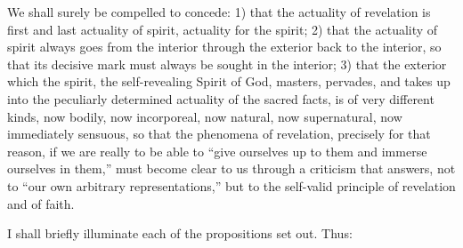 \documentclass[12pt]{book}
\newcommand{\opage}[1]{\marginnote{\footnotesize\textit{[#1]}}}
\begin{document}
We shall surely be compelled to concede: 1) that the actuality of
revelation is first and last actuality of spirit, actuality for the
spirit; 2) that the actuality of spirit always goes from the interior
through the exterior back to the interior, so that its decisive mark must
always be sought in the interior; 3) that the exterior which the spirit,
the self-revealing Spirit of God, masters, pervades, and takes up into
the peculiarly determined actuality of the sacred facts, is of very
different kinds, now bodily, now incorporeal, now natural, now
supernatural, now immediately sensuous, so that the phenomena of
revelation, precisely for that reason, if we are really to be able to
``give ourselves up to them and immerse ourselves in them,'' must become
clear to us through a criticism that answers, not to ``our own arbitrary
\opage{303}\setcounter{footnote}{0}%
representations,'' but to the self-valid principle of revelation and of
faith.

I shall briefly illuminate each of the propositions set out. Thus:
\end{document}
